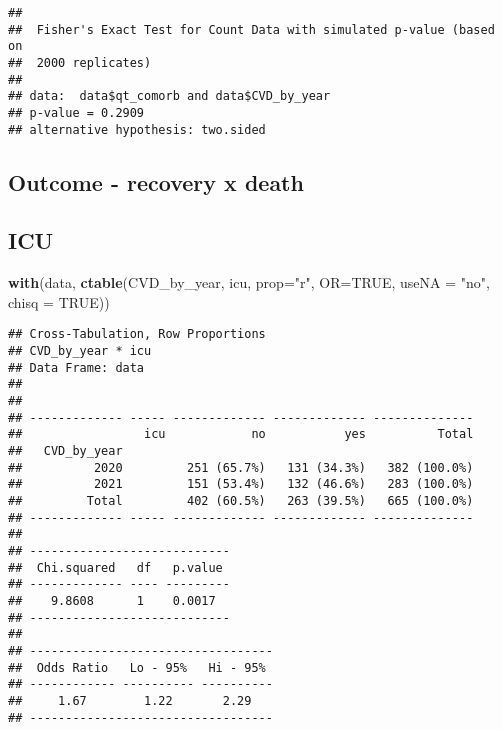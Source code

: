 \documentclass[
]{article}
\newenvironment{Shaded}{\begin{snugshade}}{\end{snugshade}}
\newcommand{\AttributeTok}[1]{\textcolor[rgb]{0.13,0.29,0.53}{#1}}
\newcommand{\ConstantTok}[1]{\textcolor[rgb]{0.56,0.35,0.01}{#1}}
\newcommand{\FunctionTok}[1]{\textcolor[rgb]{0.13,0.29,0.53}{\textbf{#1}}}
\newcommand{\NormalTok}[1]{#1}
\newcommand{\SpecialCharTok}[1]{\textcolor[rgb]{0.81,0.36,0.00}{\textbf{#1}}}
\newcommand{\StringTok}[1]{\textcolor[rgb]{0.31,0.60,0.02}{#1}}
\begin{document}
\begin{Shaded}
\end{Shaded}

\begin{verbatim}
## 
##  Fisher's Exact Test for Count Data with simulated p-value (based on
##  2000 replicates)
## 
## data:  data$qt_comorb and data$CVD_by_year
## p-value = 0.2909
## alternative hypothesis: two.sided
\end{verbatim}

\hypertarget{outcome---recovery-x-death}{%
\subsection{Outcome - recovery x
death}\label{outcome---recovery-x-death}}

\hypertarget{icu}{%
\subsection{ICU}\label{icu}}

\begin{Shaded}
\begin{Highlighting}[]
\FunctionTok{with}\NormalTok{(data, }\FunctionTok{ctable}\NormalTok{(CVD\_by\_year, icu, }\AttributeTok{prop=}\StringTok{"r"}\NormalTok{, }\AttributeTok{OR=}\ConstantTok{TRUE}\NormalTok{, }\AttributeTok{useNA =} \StringTok{"no"}\NormalTok{, }\AttributeTok{chisq =} \ConstantTok{TRUE}\NormalTok{))}
\end{Highlighting}
\end{Shaded}

\begin{verbatim}
## Cross-Tabulation, Row Proportions  
## CVD_by_year * icu  
## Data Frame: data  
## 
## 
## ------------- ----- ------------- ------------- --------------
##                 icu            no           yes          Total
##   CVD_by_year                                                 
##          2020         251 (65.7%)   131 (34.3%)   382 (100.0%)
##          2021         151 (53.4%)   132 (46.6%)   283 (100.0%)
##         Total         402 (60.5%)   263 (39.5%)   665 (100.0%)
## ------------- ----- ------------- ------------- --------------
## 
## ----------------------------
##  Chi.squared   df   p.value 
## ------------- ---- ---------
##    9.8608      1    0.0017  
## ----------------------------
## 
## ----------------------------------
##  Odds Ratio   Lo - 95%   Hi - 95% 
## ------------ ---------- ----------
##     1.67        1.22       2.29   
## ----------------------------------
\end{verbatim}
\end{document}
